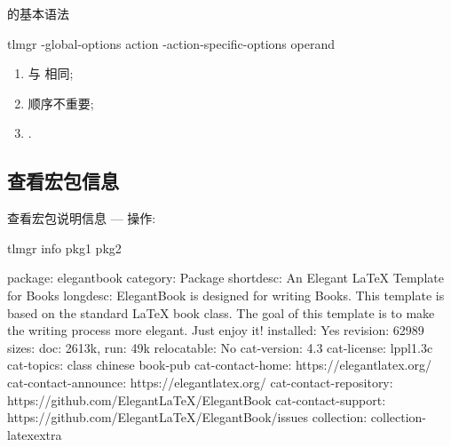 \begin{frame}[fragile]{\tlmgr 的基本语法}
\begin{cmdcode}
tlmgr -global-options action -action-specific-options operand
\end{cmdcode}
\begin{enumerate}
  \item \cmd{-} 与 \cmd{--} 相同;
  \item 顺序不重要;
  \item {}.
\end{enumerate}
\end{frame}

\subsection{查看宏包信息}

\begin{frame}[fragile]{查看宏包说明信息 --- 操作: }
\begin{cmdcode}
tlmgr info pkg1 pkg2
\end{cmdcode}
  \begin{outputcode}
package:     elegantbook
category:    Package
shortdesc:   An Elegant LaTeX Template for Books
longdesc:    ElegantBook is designed for writing Books. This template is based on the standard LaTeX book class. The goal of this template is to make the writing process more elegant. Just enjoy it!
installed:   Yes
revision:    62989
sizes:       doc: 2613k, run: 49k
relocatable: No
cat-version: 4.3
cat-license: lppl1.3c
cat-topics:  class chinese book-pub
cat-contact-home: https://elegantlatex.org/
cat-contact-announce: https://elegantlatex.org/
cat-contact-repository: https://github.com/ElegantLaTeX/ElegantBook
cat-contact-support: https://github.com/ElegantLaTeX/ElegantBook/issues
collection:  collection-latexextra
  \end{outputcode}
  \end{frame}

